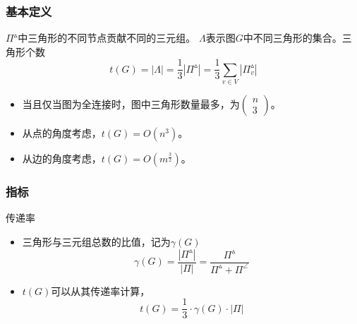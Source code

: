 \documentclass{beamer}
\begin{document}
\begin{frame}
\frametitle{基本定义}
$\Pi^\vartriangle $中三角形的不同节点贡献不同的三元组。
$\Lambda$表示图$G$中不同三角形的集合。三角形个数
\begin{equation}
    t(G)=|\Lambda|=\frac{1}{3}|\Pi^\vartriangle|=\frac{1}{3}\sum_{v\in V}|\Pi^\vartriangle_v|
    \label{eq:triangle_num}
\end{equation}
\begin{itemize}
\item 当且仅当图为全连接时，图中三角形数量最多，为$\left(\begin{array}{l}n \\3\end{array}\right)$。\\
\item 从点的角度考虑，$t(G)=O(n^{3})$。\\
\item 从边的角度考虑，$t(G)=O(m^{\frac{3}{2}})$。
\end{itemize}
\end{frame}


\begin{frame}
\frametitle{指标}
传递率
\begin{itemize}
\item 三角形与三元组总数的比值，记为$\gamma(G)$
\begin{equation}
    \gamma(G)=\frac{|\Pi^\vartriangle|}{|\Pi|}=\frac{\Pi^\vartriangle}{\Pi^\vartriangle+\Pi^\angle}
    \label{eq:transitivity}
\end{equation}
\item $t(G)$可以从其传递率计算，
\begin{equation}
    t(G)=\frac{1}{3}\cdot \gamma(G) \cdot |\Pi| 
    \label{eq:tc_trans}
\end{equation}
\end{itemize}
\end{frame}
\end{document}
